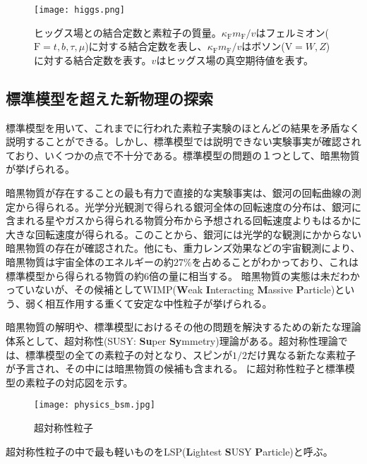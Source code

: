 \begin{figure}[tbp]
  \centering
  \texttt{[image: higgs.png]}
  \caption[ヒッグス場との結合定数と素粒子の質量]{ヒッグス場との結合定数と素粒子の質量\cite{higgs}。$\kappa_\mathrm{F} m_\mathrm{F}/v$はフェルミオン($\mathrm{F}=t, b, \tau, \mu$)に対する結合定数を表し、$\kappa_\mathrm{F} m_\mathrm{F}/v$はボソン($\mathrm{V}=W, Z$)に対する結合定数を表す。$v$はヒッグス場の真空期待値を表す。 }
  \label{fig:higgs}
\end{figure}

\subsection{標準模型を超えた新物理の探索\cite{evidenceDark}}
\label{sec:bsm}

標準模型を用いて、これまでに行われた素粒子実験のほとんどの結果を矛盾なく説明することができる。しかし、標準模型では説明できない実験事実が確認されており、いくつかの点で不十分である。標準模型の問題の１つとして、暗黒物質が挙げられる。

暗黒物質が存在することの最も有力で直接的な実験事実は、銀河の回転曲線の測定から得られる。光学分光観測で得られる銀河全体の回転速度の分布は、銀河に含まれる星やガスから得られる物質分布から予想される回転速度よりもはるかに大きな回転速度が得られる。このことから、銀河には光学的な観測にかからない暗黒物質の存在が確認された。他にも、重力レンズ効果などの宇宙観測により、暗黒物質は宇宙全体のエネルギーの約$27\%$を占めることがわかっており、これは標準模型から得られる物質の約$6$倍の量に相当する。
暗黒物質の実態は未だわかっていないが、その候補としてWIMP(\textbf{W}eak \textbf{I}nteracting \textbf{M}assive \textbf{P}article)という、弱く相互作用する重くて安定な中性粒子が挙げられる。


暗黒物質の解明や、標準模型におけるその他の問題を解決するための新たな理論体系として、超対称性(SUSY: \textbf{Su}per \textbf{Sy}mmetry)理論がある。超対称性理論では、標準模型の全ての素粒子の対となり、スピンが$1/2$だけ異なる新たな素粒子が予言され、その中には暗黒物質の候補も含まれる。
に超対称性粒子と標準模型の素粒子の対応図を示す。
\begin{figure}[tbp]
  \centering
  \texttt{[image: physics\_bsm.jpg]}
  \caption[超対称性粒子]{超対称性粒子 \cite{kek} }
  \label{fig:physics_bsm}
\end{figure}
超対称性粒子の中で最も軽いものをLSP(\textbf{L}ightest \textbf{S}USY \textbf{P}article)と呼ぶ。

